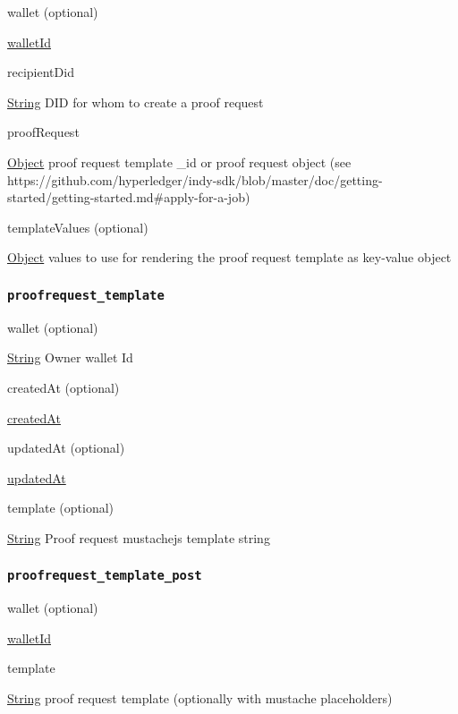 wallet (optional)

{\protect\hyperlink{walletId}{walletId}}

recipientDid

{\protect\hyperlink{string}{String}} DID for whom to create a proof
request

proofRequest

{\protect\hyperlink{object}{Object}} proof request template \_id or
proof request object (see
https://github.com/hyperledger/indy-sdk/blob/master/doc/getting-started/getting-started.md\#apply-for-a-job)

templateValues (optional)

{\protect\hyperlink{object}{Object}} values to use for rendering the
proof request template as key-value object

\hypertarget{proofrequest_template}{%
\subsubsection{\texorpdfstring{\protect\hypertarget{proofrequest_template}{}{\texttt{proofrequest\_template}}}{proofrequest\_template}}\label{proofrequest_template}}

wallet (optional)

{\protect\hyperlink{string}{String}} Owner wallet Id

createdAt (optional)

{\protect\hyperlink{createdAt}{createdAt}}

updatedAt (optional)

{\protect\hyperlink{updatedAt}{updatedAt}}

template (optional)

{\protect\hyperlink{string}{String}} Proof request mustachejs template
string

\hypertarget{proofrequest_template_post}{%
\subsubsection{\texorpdfstring{\protect\hypertarget{proofrequest_template_post}{}{\texttt{proofrequest\_template\_post}}}{proofrequest\_template\_post}}\label{proofrequest_template_post}}

wallet (optional)

{\protect\hyperlink{walletId}{walletId}}

template

{\protect\hyperlink{string}{String}} proof request template (optionally
with mustache placeholders)

